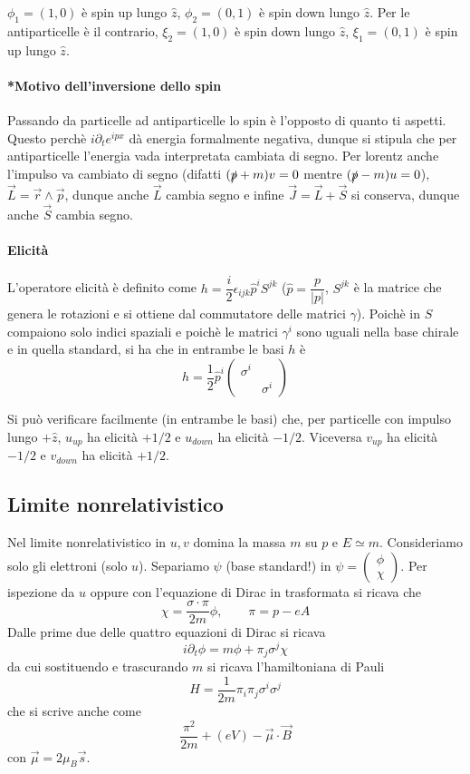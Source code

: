 \documentclass[12pt,a4paper]{article}
\begin{document}
	$\phi_1 = (1,0)$ è spin up lungo $\hat{z}$, $\phi_2 = (0,1)$ è spin down lungo $\hat{z}$. Per le antiparticelle è il contrario, $\xi_2 = (1,0)$ è spin down lungo $\hat{z}$, $\xi_1 = (0,1)$ è spin up lungo $\hat{z}$.
	
	\paragraph{*Motivo dell'inversione dello spin} Passando da particelle ad antiparticelle lo spin è l'opposto di quanto ti aspetti. Questo perchè $i\partial_t e^{ipx}$ dà energia formalmente negativa, dunque si stipula che per antiparticelle l'energia vada interpretata cambiata di segno. Per lorentz anche l'impulso va cambiato di segno (difatti $(\slashed{p}+m)v=0$ mentre $(\slashed{p}-m)u=0$), $\vec{L} = \vec{r}\wedge \vec{p}$, dunque anche $\vec{L}$ cambia segno e infine $\vec{J} = \vec{L} + \vec{S}$ si conserva, dunque anche $\vec{S}$ cambia segno.
	
	\paragraph{Elicità}
	L'operatore elicità è definito come $h = \dfrac{i}{2} \epsilon_{ijk}\hat{p}^iS^{jk}$ ($\hat{p}=\dfrac{p}{|p|}$, $S^{jk}$ è la matrice che genera le rotazioni e si ottiene dal commutatore delle matrici $\gamma$). Poichè in $S$ compaiono solo indici spaziali e poichè le matrici $\gamma^i$ sono uguali nella base chirale e in quella standard, si ha che in entrambe le basi $h$ è
	\[ h = \dfrac{1}{2} \hat{p}^i \begin{pmatrix}
	\sigma^i &\\ & \sigma^i
	\end{pmatrix} \]
	
	Si può verificare facilmente (in entrambe le basi) che, per particelle con impulso lungo $+\hat{z}$, $u_{up}$ ha elicità $+1/2$ e $u_{down}$ ha elicità $-1/2$. Viceversa $v_{up}$ ha elicità $-1/2$ e $v_{down}$ ha elicità $+1/2$.
	
	\subsection{Limite nonrelativistico}
	Nel limite nonrelativistico in $u,v$ domina la massa $m$ su $p$ e $E\simeq m$. Consideriamo solo gli elettroni (solo $u$). Separiamo $\psi$ (base standard!) in $\psi = \begin{pmatrix}	\phi\\ \chi \end{pmatrix}$. Per ispezione da $u$ oppure con l'equazione di Dirac in trasformata si ricava che 
	\[ \chi = \dfrac{\sigma\cdot \pi}{2m} \phi,\qquad \pi = p-eA \]
	Dalle prime due delle quattro equazioni di Dirac si ricava
	\[ i\partial_t \phi = m\phi + \pi_j \sigma^j \chi  \]
	da cui sostituendo e trascurando $m$ si ricava l'hamiltoniana di Pauli
	\[ H = \dfrac{1}{2m} \pi_i\pi_j \sigma^i\sigma^j \]
	che si scrive anche come
	\[ \dfrac{\pi^2}{2m} +(e V) - \vec{\mu}\cdot \vec{B} \]
	con $\vec{\mu} = 2 \mu_B \vec{s}$.
\end{document}

